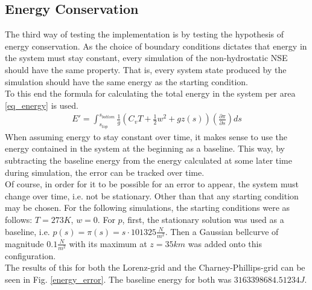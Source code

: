 \subsection{Energy Conservation}\label{sec:energy_conservation_test}
The third way of testing the implementation is by testing the hypothesis of energy conservation.
As the choice of boundary conditions dictates that energy in the system must stay constant, every simulation of the non-hydrostatic NSE should have the same property.
That is, every system state produced by the simulation should have the same energy as the starting condition.\\
To this end the formula for calculating the total energy in the system per area \ref{eq_energy} is used.
\begin{align*}
E'=\int_{s_{top}}^{s_{bottom}} \frac{1}{g}(C_vT+\frac{1}{2}w^2 + gz(s)) \left( \frac{\partial \pi}{\partial s} \right) ds
\end{align*}
When assuming energy to stay constant over time, it makes sense to use the energy contained in the system at the beginning as a baseline.
This way, by subtracting the baseline energy from the energy calculated at some later time during simulation, the error can be tracked over time.\\
Of course, in order for it to be possible for an error to appear, the system must change over time, i.e. not be stationary.
Other than that any starting condition may be chosen.
For the following simulations, the starting conditions were as follows: $T=273K$, $w=0$.
For $p$, first, the stationary solution was used as a baseline, i.e. $p(s)=\pi (s)=s\cdot 101325\frac{N}{m^2}$.
Then a Gaussian bellcurve of magnitude $0.1\frac{N}{m^2}$ with its maximum at $z=35km$ was added onto this configuration.
\\
The results of this for both the Lorenz-grid and the Charney-Phillips-grid can be seen in Fig. \ref{energy_error}.
The baseline energy for both was $3163398684.51234J$.

